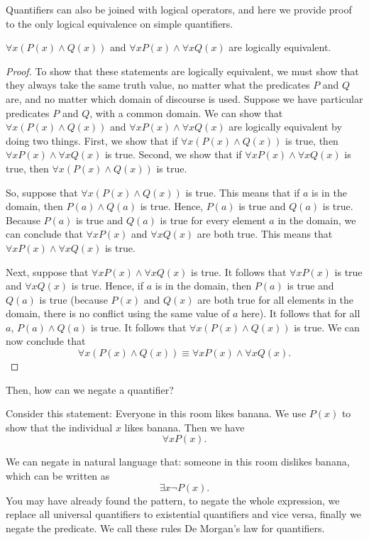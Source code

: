 Quantifiers can also be joined with logical operators, and here we provide proof to the only logical equivalence on simple quantifiers.
\begin{theorem}
\(\forall x (P(x) \land Q(x))\) and \(\forall x P(x) \land \forall x Q(x)\) are logically equivalent.
\end{theorem}

\begin{proof}
To show that these statements are logically equivalent, we must show that they always take the same truth value, no matter what the predicates \(P\) and \(Q\) are, and no matter which domain of discourse is used. Suppose we have particular predicates \(P\) and \(Q\), with a common domain. We can show that \(\forall x (P(x) \land Q(x))\) and \(\forall x P(x) \land \forall x Q(x)\) are logically equivalent by doing two things. First, we show that if \(\forall x (P(x) \land Q(x))\) is true, then \(\forall x P(x) \land \forall x Q(x)\) is true. Second, we show that if \(\forall x P(x) \land \forall x Q(x)\) is true, then \(\forall x (P(x) \land Q(x))\) is true.

So, suppose that \(\forall x (P(x) \land Q(x))\) is true. This means that if \(a\) is in the domain, then \(P(a) \land Q(a)\) is true. Hence, \(P(a)\) is true and \(Q(a)\) is true. Because \(P(a)\) is true and \(Q(a)\) is true for every element \(a\) in the domain, we can conclude that \(\forall x P(x)\) and \(\forall x Q(x)\) are both true. This means that \(\forall x P(x) \land \forall x Q(x)\) is true.

Next, suppose that \(\forall x P(x) \land \forall x Q(x)\) is true. It follows that \(\forall x P(x)\) is true and \(\forall x Q(x)\) is true. Hence, if \(a\) is in the domain, then \(P(a)\) is true and \(Q(a)\) is true (because \(P(x)\) and \(Q(x)\) are both true for all elements in the domain, there is no conflict using the same value of \(a\) here). It follows that for all \(a\), \(P(a) \land Q(a)\) is true. It follows that \(\forall x (P(x) \land Q(x))\) is true. We can now conclude that
\[
\forall x (P(x) \land Q(x)) \equiv \forall x P(x) \land \forall x Q(x).
\]
\end{proof}

Then, how can we negate a quantifier?

Consider this statement: Everyone in this room likes banana.
We use $P(x)$ to show that the individual $x$ likes banana.
Then we have \[\forall x P(x).\]

We can negate in natural language that: someone in this room dislikes banana, which can be written as
\[\exists x\neg P(x).\]
You may have already found the pattern, to negate the whole expression, we replace all universal quantifiers to existential quantifiers and vice versa, finally we negate the predicate. We call these rules De Morgan's law for quantifiers.


